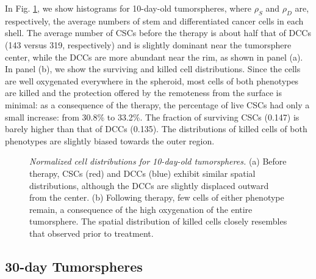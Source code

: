 \documentclass[10pt,letterpaper]{article}
\begin{document}
In Fig. \ref{f:dosis_const}, we show histograms for 10-day-old tumorspheres, where $\rho_S$ and $\rho_D$ are, respectively, the average numbers of stem and differentiated cancer cells in each shell. The average number of CSCs before the therapy is about half that of DCCs (143 versus 319, respectively) and is slightly dominant near the tumorsphere center, while the DCCs are more abundant near the rim, as shown in  panel (a). In panel (b), we show the surviving and killed cell distributions. Since the cells are well oxygenated everywhere in the spheroid, most cells of both phenotypes are killed and the protection offered by the remoteness from the surface is minimal: as a consequence of the therapy, the percentage of live CSCs had only a small increase: from 30.8\% to 33.2\%. The fraction of surviving CSCs (0.147) is barely higher than that of DCCs (0.135). The distributions of killed cells of both phenotypes are slightly biased towards the outer region. 

\begin{figure}
	\centering
	\caption{\emph{Normalized cell distributions for 10-day-old tumorspheres.} (a) Before therapy, CSCs (red) and DCCs (blue) exhibit similar spatial distributions, although the DCCs are slightly displaced outward from the center. (b) Following therapy, few cells of either phenotype remain, a consequence of the high oxygenation of the entire tumorsphere.  The spatial distribution of killed cells closely resembles that observed prior to treatment.}
	\label{f:dosis_const}
\end{figure}




\subsection*{30-day Tumorspheres}\label{ss:30-day}
\end{document}
